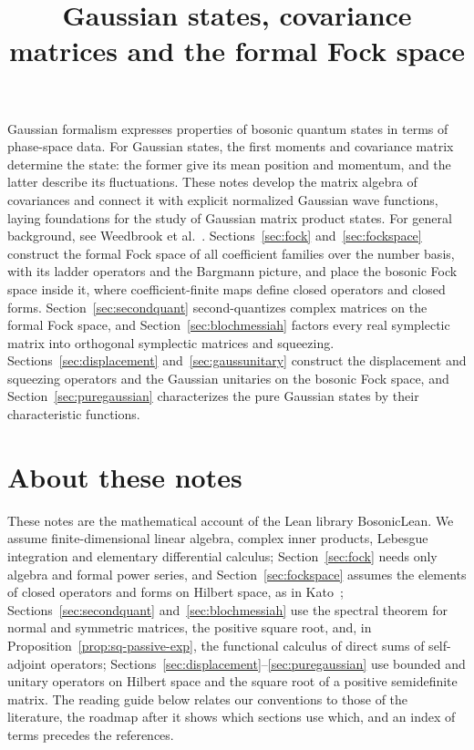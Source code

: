 \documentclass[11pt]{article}
\title{Gaussian states, covariance matrices and the formal Fock space}
\author{}
\date{}
\numberwithin{equation}{section}
\theoremstyle{definition}
\theoremstyle{plain}
\newcommand{\vetb}[1]{#1}
\newcommand{\revs}[1]{#1}
\newcommand{\vetd}[1]{#1}
\newcommand{\vete}[1]{#1}
\begin{document}
\GaussianEnableLinks
\maketitle
\vspace{-2em}
\noindent Gaussian formalism expresses properties of bosonic quantum states in terms
of phase-space data. For Gaussian states, the first moments and covariance matrix
determine the state: the former give its mean position and momentum, and the latter
describe its fluctuations. These notes develop the matrix algebra of covariances
and connect it with explicit normalized Gaussian wave functions, laying foundations
for the study of Gaussian matrix product states. For general background, see
Weedbrook et al.~\cite[Sec.~II]{weedbrook}. \vetb{Sections~\ref{sec:fock} and~\ref{sec:fockspace} construct the
formal Fock space of all coefficient families over the number basis, with its ladder operators and the Bargmann
picture, and place the bosonic Fock space inside it, where coefficient-finite maps define closed operators and
closed forms.} \vetd{Section~\ref{sec:secondquant} second-quantizes complex matrices on the formal Fock space, and
Section~\ref{sec:blochmessiah} factors every real symplectic matrix into orthogonal symplectic matrices and squeezing.}
\vete{Sections~\ref{sec:displacement} and~\ref{sec:gaussunitary} construct the displacement and squeezing operators and
the Gaussian unitaries on the bosonic Fock space, and Section~\ref{sec:puregaussian} characterizes the pure Gaussian
states by their characteristic functions.}

\medskip
\enlargethispage{\baselineskip}
\tableofcontents
\clearpage

\section*{About these notes}
\noindent\revs{These notes are the mathematical account of the Lean library BosonicLean. We assume}
finite-dimensional linear algebra, complex inner products,
Lebesgue integration and elementary differential calculus\revs{; Section~\ref{sec:fock} needs only
algebra and formal power series}\vetb{, and Section~\ref{sec:fockspace} assumes the elements of closed operators
and forms on Hilbert space, as in Kato~\cite{kato}}\vetd{; Sections~\ref{sec:secondquant} and~\ref{sec:blochmessiah}
use the spectral theorem for normal and symmetric matrices, the positive square root, and, in Proposition~\ref{prop:sq-passive-exp}, the functional calculus of direct sums of self-adjoint operators}\vete{; Sections~\ref{sec:displacement}--\ref{sec:puregaussian}
use bounded and unitary operators on Hilbert space and the square root of a positive semidefinite matrix}\revs{. The reading guide below relates our conventions to those of the
literature, the roadmap after it shows which sections use which, and an index of terms precedes
the references.}
\end{document}
